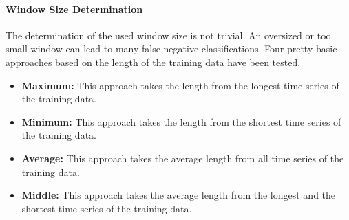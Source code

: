 \paragraph{Window Size Determination} \label{window_size_determination}
The determination of the used window size is not trivial. An oversized or too small window can lead to many false
negative classifications. Four pretty basic approaches based on the length of the training data have been tested.

\begin{itemize}
    \item \textbf{Maximum:} This approach takes the length from the longest time series of the training data.
    \item \textbf{Minimum:} This approach takes the length from the shortest time series of the training data.
    \item \textbf{Average:} This approach takes the average length from all time series of the training data.
    \item \textbf{Middle:} This approach takes the average length from the longest and the shortest time series of the
    training data.
\end{itemize}

